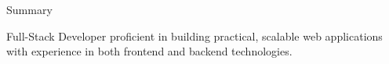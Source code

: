 \documentclass{resume} %
\begin{document}
\begin{rSection}{Summary}

{Full-Stack Developer proficient in building practical, scalable web applications with experience in both frontend and backend technologies.
}

\end{rSection}



\end{document}
